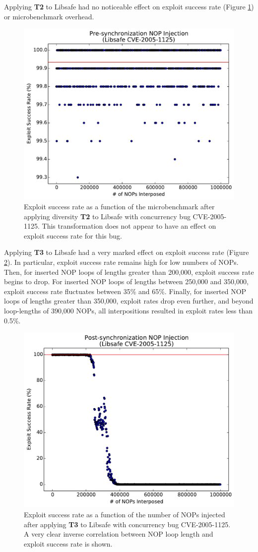 Applying \textbf{T2} to Libsafe had no noticeable effect on exploit success rate (Figure \ref{fig_libsafe-pre}) or microbenchmark overhead.
\begin{figure}
	\centering
	\includegraphics[width=.75\columnwidth]{figures/libsafe-pre}
	\caption{
		Exploit success rate as a function of the microbenchmark after applying diversity \textbf{T2} to Libsafe with concurrency bug CVE-2005-1125.
		This transformation does not appear to have an effect on exploit success rate for this bug.
	}
	\label{fig_libsafe-pre}
\end{figure}

Applying \textbf{T3} to Libsafe had a very marked effect on exploit success rate (Figure \ref{fig_libsafe-post}).
In particular, exploit success rate remains high for low numbers of NOPs.
Then, for inserted NOP loops of lengths greater than 200,000, exploit success rate begins to drop.
For inserted NOP loops of lengths between 250,000 and 350,000, exploit success rate fluctuates between 35\% and 65\%.
Finally, for inserted NOP loops of lengths greater than 350,000, exploit rates drop even further, and beyond loop-lengths of 390,000 NOPs, all interpositions resulted in exploit rates less than 0.5\%.
\begin{figure}
	\centering
	\includegraphics[width=.75\columnwidth]{figures/libsafe-post}
	\caption{
		Exploit success rate as a function of the number of NOPs injected after applying \textbf{T3} to Libsafe with concurrency bug CVE-2005-1125.
		A very clear inverse correlation between NOP loop length and exploit success rate is shown.
	}
	\label{fig_libsafe-post}
\end{figure}

